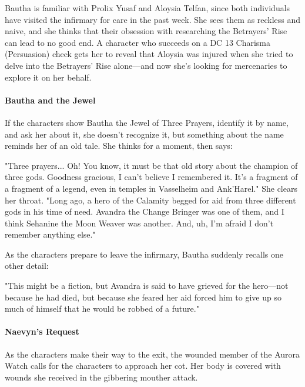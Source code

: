 \documentclass[10pt,a4paper,twoside,bg=print,twocolumn,openany,nodeprecatedcode]{dndbook}
\begin{document}
Bautha is familiar with Prolix Yusaf and Aloysia Telfan, since both individuals have visited the infirmary for care in the past week. She sees them as reckless and naive, and she thinks that their obsession with researching the Betrayers' Rise can lead to no good end. A character who succeeds on a DC 13 Charisma (Persuasion) check gets her to reveal that Aloysia was injured when she tried to delve into the Betrayers' Rise alone—and now she's looking for mercenaries to explore it on her behalf.

\paragraph{Bautha and the Jewel}
If the characters show Bautha the Jewel of Three Prayers, identify it by name, and ask her about it, she doesn't recognize it, but something about the name reminds her of an old tale. She thinks for a moment, then says:

\begin{DndReadAloud}{}
"Three prayers... Oh! You know, it must be that old story about the champion of three gods. Goodness gracious, I can't believe I remembered it. It's a fragment of a fragment of a legend, even in temples in Vasselheim and Ank'Harel." She clears her throat. "Long ago, a hero of the Calamity begged for aid from three different gods in his time of need. Avandra the Change Bringer was one of them, and I think Sehanine the Moon Weaver was another. And, uh, I'm afraid I don't remember anything else."

\end{DndReadAloud}

As the characters prepare to leave the infirmary, Bautha suddenly recalls one other detail:

\begin{DndReadAloud}{}
"This might be a fiction, but Avandra is said to have grieved for the hero—not because he had died, but because she feared her aid forced him to give up so much of himself that he would be robbed of a future."

\end{DndReadAloud}

\paragraph{Naevyn's Request}
As the characters make their way to the exit, the wounded member of the Aurora Watch calls for the characters to approach her cot. Her body is covered with wounds she received in the gibbering mouther attack.
\end{document}
